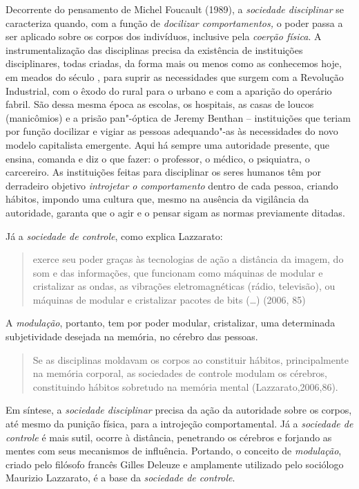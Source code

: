 Decorrente do pensamento de Michel Foucault (1989), a \emph{sociedade
disciplinar} se caracteriza quando, com a função de \emph{docilizar
comportamentos,} o poder passa a ser aplicado sobre os corpos dos
indivíduos, inclusive pela \emph{coerção física}. A instrumentalização
das disciplinas precisa da existência de instituições disciplinares,
todas criadas, da forma mais ou menos como as conhecemos hoje, em meados
do século , para suprir as necessidades que surgem com a Revolução
Industrial, com o êxodo do rural para o urbano e com a aparição do
operário fabril. São dessa mesma época as escolas, os hospitais, as
casas de loucos (manicômios) e a prisão pan"-óptica de Jeremy Benthan --
instituições que teriam por função docilizar e vigiar as pessoas
adequando"-as às necessidades do novo modelo capitalista emergente. Aqui
há sempre uma autoridade presente, que ensina, comanda e diz o que
fazer: o professor, o médico, o psiquiatra, o carcereiro. As
instituições feitas para disciplinar os seres humanos têm por derradeiro
objetivo \emph{introjetar o comportamento} dentro de cada pessoa,
criando hábitos, impondo uma cultura que, mesmo na ausência da
vigilância da autoridade, garanta que o agir e o pensar sigam as normas
previamente ditadas.

Já a \emph{sociedade de controle}, como explica Lazzarato:

\begin{quote}
exerce seu poder graças às tecnologias de ação a distância da imagem, do
som e das informações, que funcionam como máquinas de modular e
cristalizar as ondas, as vibrações eletromagnéticas (rádio, televisão),
ou máquinas de modular e cristalizar pacotes de bits (\ldots{}) (2006, 85)
\end{quote}

A \emph{modulação}, portanto, tem por poder modular, cristalizar, uma
determinada subjetividade desejada na memória, no cérebro das pessoas.

\begin{quote}
Se as disciplinas moldavam os corpos ao constituir hábitos,
principalmente na memória corporal, as sociedades de controle modulam os
cérebros, constituindo hábitos sobretudo na memória mental
(Lazzarato,2006,86).
\end{quote}

Em síntese, a \emph{sociedade disciplinar} precisa da ação da autoridade
sobre os corpos, até mesmo da punição física, para a introjeção
comportamental. Já a \emph{sociedade de controle} é mais sutil, ocorre à
distância, penetrando os cérebros e forjando as mentes com seus
mecanismos de influência. Portando, o conceito de \emph{modulação},
criado pelo filósofo francês Gilles Deleuze e amplamente utilizado pelo
sociólogo Maurizio Lazzarato, é a base da \emph{sociedade de controle}.

